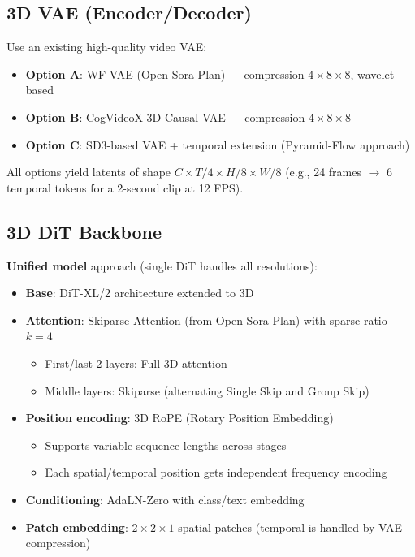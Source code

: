 \documentclass[11pt,a4paper]{article}
\begin{document}
\subsection{3D VAE (Encoder/Decoder)}

Use an existing high-quality video VAE:
\begin{itemize}[nosep]
\item \textbf{Option A}: WF-VAE (Open-Sora Plan) --- compression $4\times8\times8$, wavelet-based
\item \textbf{Option B}: CogVideoX 3D Causal VAE --- compression $4\times8\times8$
\item \textbf{Option C}: SD3-based VAE + temporal extension (Pyramid-Flow approach)
\end{itemize}

All options yield latents of shape $C \times T/4 \times H/8 \times W/8$ (e.g., 24 frames $\to$ 6 temporal tokens for a 2-second clip at 12 FPS).

\subsection{3D DiT Backbone}

\textbf{Unified model} approach (single DiT handles all resolutions):

\begin{itemize}[nosep]
\item \textbf{Base}: DiT-XL/2 architecture extended to 3D
\item \textbf{Attention}: Skiparse Attention (from Open-Sora Plan) with sparse ratio $k=4$
  \begin{itemize}[nosep]
  \item First/last 2 layers: Full 3D attention
  \item Middle layers: Skiparse (alternating Single Skip and Group Skip)
  \end{itemize}
\item \textbf{Position encoding}: 3D RoPE (Rotary Position Embedding)
  \begin{itemize}[nosep]
  \item Supports variable sequence lengths across stages
  \item Each spatial/temporal position gets independent frequency encoding
  \end{itemize}
\item \textbf{Conditioning}: AdaLN-Zero with class/text embedding
\item \textbf{Patch embedding}: $2\times2\times1$ spatial patches (temporal is handled by VAE compression)
\end{itemize}
\end{document}
